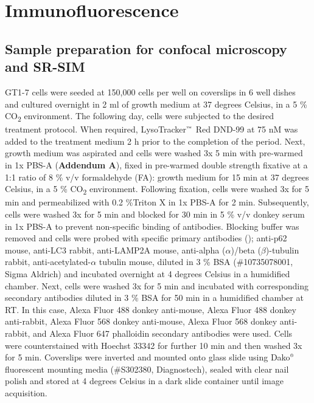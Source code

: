 \section{Immunofluorescence}
\subsection{Sample preparation for confocal microscopy and SR-SIM}
GT1-7 cells were seeded at 150,000 cells per well on coverslips in 6 well dishes and cultured overnight in 2 ml of growth medium at 37 degrees Celsius, in a 5 \% CO\textsubscript{2} environment. The following day, cells were subjected to the desired treatment protocol. When required, LysoTracker${\textsuperscript{\tiny{\texttrademark}}}$ Red DND-99 at 75 nM was added to the treatment medium 2 h prior to the completion of the period. Next, growth medium was aspirated and cells were washed 3x 5 min with pre-warmed in 1x PBS-A (\textbf{Addendum A}), fixed in pre-warmed double strength fixative at a 1:1 ratio of 8 \% v/v formaldehyde (FA): growth medium for 15 min at 37 degrees Celsius, in a 5 \% CO\textsubscript{2} environment. Following fixation, cells were washed 3x for 5 min and permeabilized with 0.2 \%Triton X in 1x PBS-A for 2 min. Subsequently, cells were washed 3x for 5 min and blocked for 30 min in 5 \% v/v donkey serum in 1x PBS-A to prevent non-specific binding of antibodies. Blocking buffer was removed and cells were probed with specific primary antibodies (); anti-p62 mouse, anti-LC3 rabbit, anti-LAMP2A mouse, anti-alpha ($\alpha$)/beta ($\beta$)-tubulin rabbit, anti-acetylated-$\alpha$ tubulin mouse, diluted in 3 \% BSA (\#10735078001, Sigma Aldrich) and incubated overnight at 4 degrees Celsius in a humidified chamber. Next, cells were washed 3x for 5 min and incubated with corresponding secondary antibodies diluted in 3 \% BSA for 50 min in a humidified chamber at RT. In this case, Alexa Fluor 488 donkey anti-mouse, Alexa Fluor 488 donkey anti-rabbit, Alexa Fluor 568 donkey anti-mouse, Alexa Fluor 568 donkey anti-rabbit, and Alexa Fluor 647 phalloidin secondary antibodies were used. Cells were counterstained with Hoechst 33342 for further 10 min and then washed 3x for 5 min. Coverslips were inverted and mounted onto glass slide using Dako${\textsuperscript{\tiny{\textregistered}}}$ fluorescent mounting media (\#S302380, Diagnostech), sealed with clear nail polish and stored at 4 degrees Celsius in a dark slide container until image acquisition.

